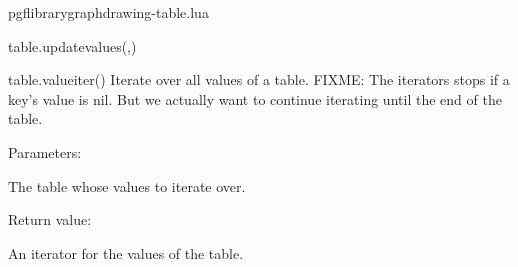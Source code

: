 \begin{filedescription}{pgflibrarygraphdrawing-table.lua}
\begin{luacommand}{{table.update\textunderscore{}values}(,)}
\end{luacommand}
\begin{luacommand}{{table.value\textunderscore{}iter}()}
Iterate over all values of a table.  FIXME: The iterators stops if a key's value is nil. But we actually want to continue iterating until the end of the table. 

Parameters:
\begin{parameterdescription}
	\item[\meta{table}] The table whose values to iterate over. 
\end{parameterdescription}


Return value:
\begin{parameterdescription} 
  \item[] An iterator for the values of the table. 
\end{parameterdescription}


\end{luacommand}

\end{filedescription}